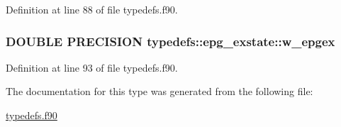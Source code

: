 Definition at line 88 of file typedefs.f90.\hypertarget{typetypedefs_1_1epg__exstate_a06dc6c0176150e54c25ebc5de0f9a50c}{
\subsubsection[{w\_\-epgex}]{\setlength{\rightskip}{0pt plus 5cm}DOUBLE PRECISION {\bf typedefs::epg\_\-exstate::w\_\-epgex}}}
\label{typetypedefs_1_1epg__exstate_a06dc6c0176150e54c25ebc5de0f9a50c}


Definition at line 93 of file typedefs.f90.

The documentation for this type was generated from the following file:\begin{DoxyCompactItemize}
\item 
\hyperlink{typedefs_8f90}{typedefs.f90}\end{DoxyCompactItemize}

